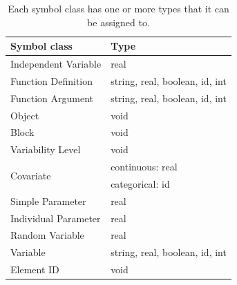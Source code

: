 \begin{table}[ht!]
\begin{center}
\small
\begin{tabular}{ll}\toprule
 Symbol class & Type \\\midrule
 Independent Variable & real\\
Function Definition & string, real, boolean, id, int\\
Function Argument & string, real, boolean, id, int\\
Object & void\\
Block & void\\
Variability Level & void\\
\multirow{2}{*}{Covariate} & continuous: real \\
                & categorical: id \\
Simple Parameter & real \\
Individual Parameter & real \\
Random Variable & real \\
Variable & string, real, boolean, id, int\\
Element ID & void\\\bottomrule
\end{tabular}
\end{center}
\caption{Each symbol class has one or more types that it can be
  assigned to.}
\label{tab:symbol-class-types}
\end{table}%


